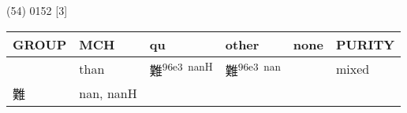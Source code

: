 \documentclass[14pt,a4paper]{scrartcl}
\begin{document}
(54) 0152 {[}3{]}

\begin{longtable}[c]{@{}llllll@{}}
\toprule
\begin{minipage}[b]{0.14\columnwidth}\raggedright\strut
GROUP
\strut\end{minipage} &
\begin{minipage}[b]{0.14\columnwidth}\raggedright\strut
MCH
\strut\end{minipage} &
\begin{minipage}[b]{0.14\columnwidth}\raggedright\strut
qu
\strut\end{minipage} &
\begin{minipage}[b]{0.14\columnwidth}\raggedright\strut
other
\strut\end{minipage} &
\begin{minipage}[b]{0.14\columnwidth}\raggedright\strut
none
\strut\end{minipage} &
\begin{minipage}[b]{0.14\columnwidth}\raggedright\strut
PURITY
\strut\end{minipage}\tabularnewline
\midrule
\endhead
\begin{minipage}[t]{0.14\columnwidth}\raggedright\strut
𡎸
\strut\end{minipage} &
\begin{minipage}[t]{0.14\columnwidth}\raggedright\strut
than
\strut\end{minipage} &
\begin{minipage}[t]{0.14\columnwidth}\raggedright\strut
難\textsuperscript{96e3~nanH}
\strut\end{minipage} &
\begin{minipage}[t]{0.14\columnwidth}\raggedright\strut
難\textsuperscript{96e3~nan}
\strut\end{minipage} &
\begin{minipage}[t]{0.14\columnwidth}\raggedright\strut
\strut\end{minipage} &
\begin{minipage}[t]{0.14\columnwidth}\raggedright\strut
mixed
\strut\end{minipage}\tabularnewline
\begin{minipage}[t]{0.14\columnwidth}\raggedright\strut
難
\strut\end{minipage} &
\begin{minipage}[t]{0.14\columnwidth}\raggedright\strut
nan, nanH
\strut\end{minipage} &
\begin{minipage}[t]{0.14\columnwidth}\raggedright\strut

\end{minipage}
\end{longtable}
\end{document}

